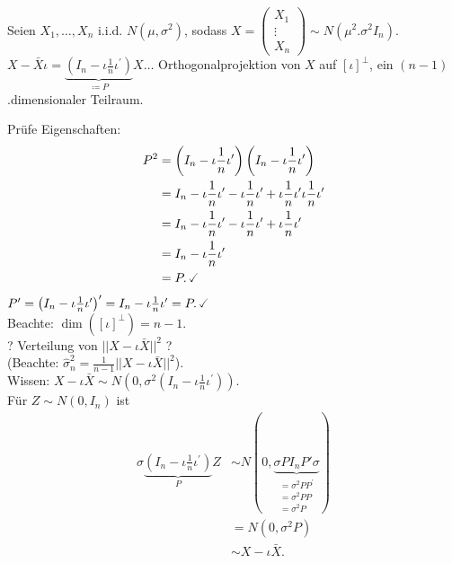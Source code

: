 \documentclass{tstextbook}
\begin{document}
\begin{example}
	
	Seien $ X_1, \ldots, X_n $ i.i.d. $ N(\mu, \sigma^2) $, sodass $ X = \begin{pmatrix}
		X_1 \\ \vdots \\ X_n
	\end{pmatrix} \sim N(\mu^2. \sigma^2 I_n) $. \\
	
	$ X - \bar{X} \iota = \underbrace{\left(I_n - \iota \frac{1}{n} \iota^\prime\right)}_{\coloneqq P} X \ldots $ Orthogonalprojektion von $ X $ auf $ [\iota]^\perp $, ein $ (n-1) $.dimensionaler Teilraum.
	
	Prüfe Eigenschaften: 
	\[
	\begin{aligned}
		P^2 & = \left(I_n - \iota \frac{1}{n} \iota^\prime\right)\left(I_n - \iota \frac{1}{n} \iota^\prime\right) \\
		& = I_n - \iota \frac{1}{n} \iota^\prime - \iota \frac{1}{n} \iota^\prime + \iota \frac{1}{n} \iota^\prime \iota \frac{1}{n} \iota^\prime \\
		& = I_n - \iota \frac{1}{n} \iota^\prime - \iota \frac{1}{n}\iota^\prime + \iota \frac{1}{n} \iota^\prime \\
		& = I_n - \iota \frac{1}{n} \iota^\prime \\
		& = P. \, \checked
	\end{aligned}
	\]
	$ P^\prime = \left(I_n - \iota \frac{1}{n} \iota^\prime\right)^\prime = I_n - \iota \frac{1}{n} \iota^\prime = P. \, \checked $ \\
	Beachte: $  \dim\left([\iota]^\perp\right) = n-1 $. \\
	
	? Verteilung von $ ||X-\iota \bar{X}||^2 $ ? \\
	
	(Beachte: $ \hat{\sigma}_n^2 = \frac{1}{n-1} ||X-\iota\bar{X}||^2 $).\\
	Wissen: $ X-\iota \bar{X} \sim N\left(0, \sigma^2\left(I_n -\iota\frac{1}{n}\iota^\prime \right)\right) $. \\
	Für $ Z \sim N(0,I_n) $ ist 
	\[
	\begin{aligned}
		\sigma \underbrace{\left(I_n -\iota\frac{1}{n}\iota^\prime \right)}_P Z & \sim N(0, \underbrace{\sigma PI_n P\prime \sigma}_{\substack{= \sigma^2PP^\prime \\ = \sigma^2 PP \\ = \sigma^2 P}}) \\
		& = N(0, \sigma^2 P) \\
		& \sim X- \iota \bar{X}.
	\end{aligned}
	\]
	

\end{example}
\end{document}
